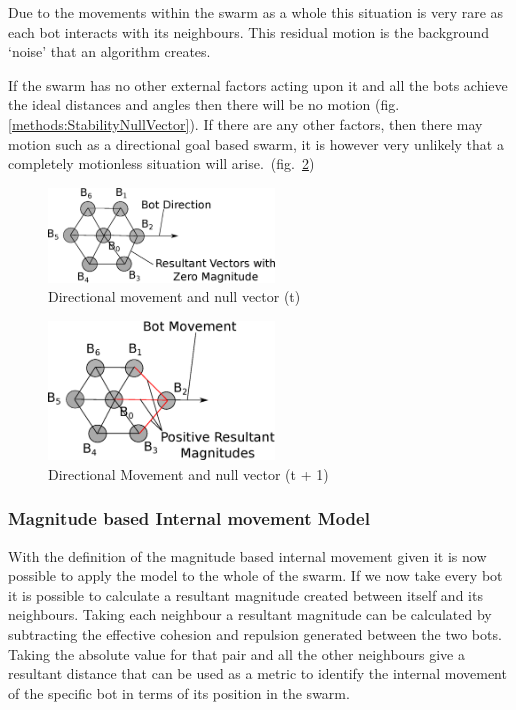 \documentclass[10pt,journal,letterpaper,twoside]{IEEEtran}
\newcommand{\stability}{internal movement}
\newcommand{\Stability}{Internal movement}
\newcommand{\Fig}{fig.}
\begin{document}
Due to the movements within the swarm as a whole this situation is very rare as each bot interacts with its neighbours. This residual motion is the background `noise' that an algorithm creates.

If the swarm has no other external factors acting upon it and all the bots achieve the ideal distances and angles then there will be no motion (\Fig{} \ref{methods:StabilityNullVector}). If there are any other factors, then there may motion such as a directional goal based swarm, it is however very unlikely that a completely motionless situation will arise.~(\Fig{}~\ref{methods:StabilityNullVector2})

\begin{figure}[H]
\begin{center}
\includegraphics[width=6cm]{figures/StabilityNullVector3}
\end{center}
\caption{Directional movement and null vector (t)} \label{methods:StabilityNullVector3}
\end{figure}

\begin{figure}[H]
\begin{center}
\includegraphics[width=6cm]{figures/StabilityNullVector2}
\end{center}
\caption{Directional Movement and null vector (t + 1)} \label{methods:StabilityNullVector2}
\end{figure}

\subsubsection{Magnitude based \Stability{} Model}\label{Section:StabilityModel}

With the definition of the magnitude based \stability{} given it is now possible to apply the model to the whole of the swarm. If we now take every bot it is possible to calculate a resultant magnitude created between itself and its neighbours. Taking each neighbour a resultant magnitude can be calculated by subtracting the effective cohesion and repulsion generated between the two bots. Taking the absolute value for that pair and all the other neighbours give a resultant distance that can be used as a metric to identify the \stability{} of the specific bot in terms of its position in the swarm.
\end{document}
